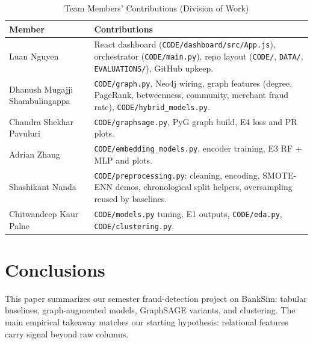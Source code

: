 \documentclass[conference]{IEEEtran}
\begin{document}
\begin{table}[H]
\centering
\caption{Team Members' Contributions (Division of Work)}
\label{tab:contributions}
\footnotesize
\begin{tabular}{@{}p{}p{}@{}}
\toprule
\textbf{Member} & \textbf{Contributions} \\
\midrule
Luan Nguyen &
React dashboard (\texttt{CODE/dashboard/src/App.js}), orchestrator (\texttt{CODE/main.py}), repo layout (\texttt{CODE/}, \texttt{DATA/}, \texttt{EVALUATIONS/}), GitHub upkeep. \\
\addlinespace
Dhanush Mugajji Shambulingappa &
\texttt{CODE/graph.py}, Neo4j wiring, graph features (degree, PageRank, betweenness, community, merchant fraud rate), \texttt{CODE/hybrid\_models.py}. \\
\addlinespace
Chandra Shekhar Pavuluri &
\texttt{CODE/graphsage.py}, PyG graph build, E4 loss and PR plots. \\
\addlinespace
Adrian Zhang &
\texttt{CODE/embedding\_models.py}, encoder training, E3 RF + MLP and plots. \\
\addlinespace
Shashikant Nanda &
\texttt{CODE/preprocessing.py}: cleaning, encoding, SMOTE-ENN demos, chronological split helpers, oversampling reused by baselines. \\
\addlinespace
Chitwandeep Kaur Palne &
\texttt{CODE/models.py} tuning, E1 outputs, \texttt{CODE/eda.py}, \texttt{CODE/clustering.py}. \\
\bottomrule
\end{tabular}
\end{table}

\section{Conclusions}

This paper summarizes our semester fraud-detection project on BankSim: tabular baselines, graph-augmented models, GraphSAGE variants, and clustering. The main empirical takeaway matches our starting hypothesis: relational features carry signal beyond raw columns.
\end{document}
